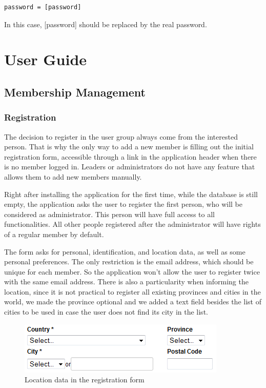 \documentclass[envcountsame,envcountchap]{svmono}
\begin{document}
\begin{verbatim}
password = [password]
\end{verbatim}

In this case, [password] should be replaced by the real password.

\part{User Guide}

\chapter{Membership Management}

\section{Registration}

The decision to register in the user group always come from the interested person. That is why the only way to add a new member is filling out the initial registration form, accessible through a link in the application header when there is no member logged in. Leaders or administrators do not have any feature that allows them to add new members manually.

Right after installing the application for the first time, while the database is still empty, the application asks the user to register the first person, who will be considered as administrator. This person will have full access to all functionalities. All other people registered after the administrator will have rights of a regular member by default.

The form asks for personal, identification, and location data, as well as some personal preferences. The only restriction is the email address, which should be unique for each member. So the application won't allow the user to register twice with the same email address. There is also a particularity when informing the location, since it is not practical to register all existing provinces and cities in the world, we made the province optional and we added a text field besides the list of cities to be used in case the user does not find its city in the list.

\begin{figure}
\centering
\includegraphics[scale=0.9]{figures/registration-location}
\caption{Location data in the registration form}
\label{fig:registration-location}
\end{figure}
\end{document}
